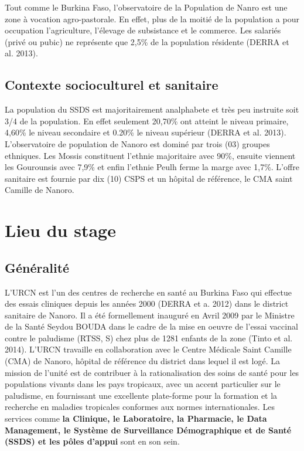 \documentclass[12pt,a4paper]{report}
\begin{document}
			Tout comme le Burkina Faso, l'observatoire de la Population de Nanro est une zone à vocation agro-pastorale. En effet, plus de la moitié de la population a pour occupation l'agriculture, l'élevage de subsistance et le commerce. Les salariés (privé ou pubic) ne représente que 2,5\% de la population résidente (DERRA et al. 2013).
			
			\subsection{Contexte socioculturel et sanitaire}
			
			La population du SSDS est majoritairement analphabete et très peu instruite soit 3/4 de la population. En effet seulement 20,70\% ont atteint le niveau primaire, 4,60\% le niveau secondaire et 0.20\% le niveau supérieur (DERRA et al. 2013). L'observatoire de population de Nanoro est dominé par trois (03) groupes ethniques. Les Mossis constituent l'ethnie majoritaire avec 90\%, ensuite viennent les Gourounsis avec 7,9\% et enfin l'ethnie Peulh ferme la marge avec 1,7\%. L'offre sanitaire est fournie par dix (10) CSPS et un hôpital de référence, le CMA saint Camille de Nanoro.
			
		\section{Lieu du stage}
			\subsection{Généralité}
			
			L'URCN est l'un des centres de recherche en santé au Burkina Faso qui effectue des essais cliniques depuis les années 2000 (DERRA et a. 2012) dans le district sanitaire de Nanoro. Il a été formellement inauguré en Avril 2009 par le Ministre de la Santé Seydou BOUDA dans le cadre de la mise en oeuvre de l'essai vaccinal contre le paludisme (RTSS, S) chez plus de 1281 enfants de la zone (Tinto et al. 2014). L'URCN travaille en collaboration avec le Centre Médicale Saint Camille (CMA) de Nanoro, hôpital de référence du district dans lequel il est logé. La mission de l'unité est de contribuer à la rationalisation des soins de santé pour les populations vivants dans les pays tropicaux, avec un accent particulier sur le paludisme, en fournissant une excellente plate-forme pour la formation et la recherche en maladies tropicales conformes aux normes internationales. Les services comme \textbf{la Clinique, le Laboratoire, la Pharmacie, le Data Management, le Système de Surveillance Démographique et de Santé (SSDS) et les pôles d'appui} sont en son sein.
			
\end{document}
